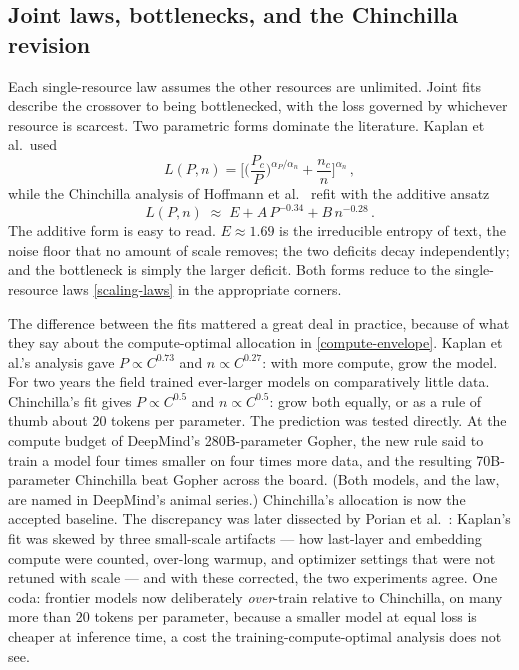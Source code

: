 \documentclass[11pt]{article}
\begin{document}
\subsection{Joint laws, bottlenecks, and the Chinchilla revision}
\label{sec:scaling-joint}

Each single-resource law assumes the other resources are unlimited. Joint fits describe the crossover to being bottlenecked, with the loss governed by whichever resource is scarcest. Two parametric forms dominate the literature. Kaplan et al.\ used
%
\begin{equation} \label{kaplan-joint}
    L(P,n) = \Big[\Big(\frac{P_c}{P}\Big)^{\alpha_P/\alpha_n} + \frac{n_c}{n}\Big]^{\alpha_n}\,,
\end{equation}
%
while the Chinchilla analysis of Hoffmann et al.\ \cite{hoffmann2022training} refit with the additive ansatz
%
\begin{equation} \label{chinchilla}
    L(P,n) \;\approx\; E + A\, P^{-0.34} + B\, n^{-0.28}\,.
\end{equation}
%
The additive form is easy to read. $E\approx 1.69$ is the irreducible entropy of text, the noise floor that no amount of scale removes; the two deficits decay independently; and the bottleneck is simply the larger deficit. Both forms reduce to the single-resource laws \eqref{scaling-laws} in the appropriate corners.

The difference between the fits mattered a great deal in practice, because of what they say about the compute-optimal allocation in \eqref{compute-envelope}. Kaplan et al.'s analysis gave $P\propto C^{0.73}$ and $n\propto C^{0.27}$: with more compute, grow the model. For two years the field trained ever-larger models on comparatively little data. Chinchilla's fit gives $P\propto C^{0.5}$ and $n\propto C^{0.5}$: grow both equally, or as a rule of thumb about $20$ tokens per parameter. The prediction was tested directly. At the compute budget of DeepMind's 280B-parameter Gopher, the new rule said to train a model four times smaller on four times more data, and the resulting 70B-parameter Chinchilla beat Gopher across the board. (Both models, and the law, are named in DeepMind's animal series.) Chinchilla's allocation is now the accepted baseline. The discrepancy was later dissected by Porian et al.\ \cite{porian2024resolving}: Kaplan's fit was skewed by three small-scale artifacts --- how last-layer and embedding compute were counted, over-long warmup, and optimizer settings that were not retuned with scale --- and with these corrected, the two experiments agree. One coda: frontier models now deliberately \emph{over}-train relative to Chinchilla, on many more than $20$ tokens per parameter, because a smaller model at equal loss is cheaper at inference time, a cost the training-compute-optimal analysis does not see.
\end{document}
